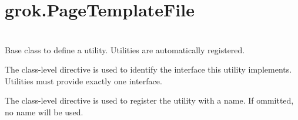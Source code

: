 \section{grok.PageTemplateFile}

\section{}

\section{}

\section{}

    Base class to define a utility. Utilities are automatically registered.

    The class-level directive  is used to identify
    the interface this utility implements. Utilities must provide exactly one
    interface.

    The class-level directive  is used to register the
    utility with a name. If ommitted, no name will be used.

\section{}

\section{}
